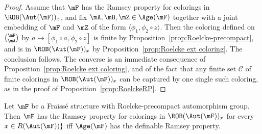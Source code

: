 \begin{proof}
Assume that $\mF$ has the Ramsey property for colorings in $\ROB(\Aut(\mF))_{x}$, and fix $\mA, \mB, \mZ\in \Age(\mF)$ together with a joint embedding of $\mF$ and $\mZ$ of the form $\langle \phi_{1}, \phi_{2}\circ z\rangle$. Then the coloring defined on $\binom{\mF}{\mA}$ by $a\mapsto [\phi_{1} \circ a,\phi_{2}\circ z]$ is finite by Proposition~\ref{prop:Roelcke-precompact}, and is in $\ROB(\Aut(\mF))_{x}$ by Proposition~\ref{prop:Roelcke ext coloring}. The conclusion follows. The converse is an immediate consequence of Proposition~\ref{prop:Roelcke ext coloring}, and of the fact that any finite set $\mathcal C$ of finite colorings in $\ROB(\Aut(\mF))_{x}$ can be captured by one single such coloring, as in the proof of Proposition~\ref{prop:RoelckeRP}.
\end{proof}


\begin{prop}\label{prop:DefinableRP}
Let $\mF$ be a Fra\"{\i}ss\'e structure with Roelcke-precompact automorphism group. Then $\mF$ has the Ramsey property for colorings in $\ROB(\Aut(\mF))_{x}$ for every $x\in R(\Aut(\mF))\}$ iff $\Age(\mF)$ has the definable Ramsey property.
\end{prop}

